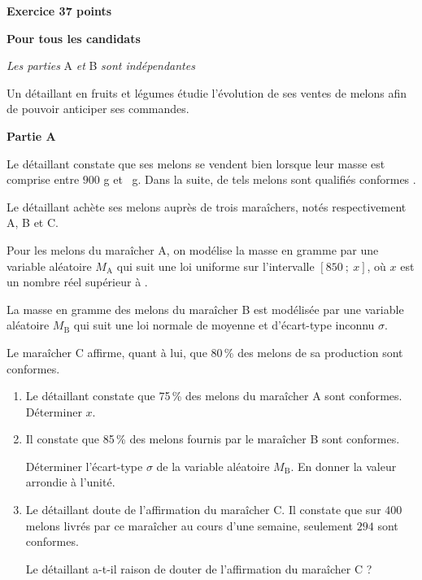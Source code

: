 \documentclass[10pt,a4paper]{article}
\begin{document}
\textbf{Exercice 3\hfill 7 points}
 
\textbf{Pour tous les candidats}

\medskip

\emph{Les parties} A \emph{et} B \emph{sont indépendantes}

\medskip

Un détaillant en fruits et légumes étudie l'évolution de ses ventes de melons afin de pouvoir
anticiper ses commandes.

\bigskip

\textbf{Partie A}

\medskip

Le détaillant constate que ses melons se vendent bien lorsque leur masse est comprise entre $900$ g et
~g. Dans la suite, de tels melons sont qualifiés \og conformes \fg.

Le détaillant achète ses melons auprès de trois maraîchers, notés respectivement A, B et C.

Pour les melons du maraîcher A, on modélise la masse en gramme par une variable aléatoire $M_{\text{A}}$
qui suit une loi uniforme sur l'intervalle $[850~;~x]$, où $x$ est un nombre réel supérieur à .

La masse en gramme des melons du maraîcher B est modélisée par une variable aléatoire $M_{\text{B}}$ qui
suit une loi normale de moyenne  et d'écart-type inconnu $\sigma$.

Le maraîcher C affirme, quant à lui, que 80\,\% des melons de sa production sont conformes.

\medskip

\begin{enumerate}
\item Le détaillant constate que 75\,\% des melons du maraîcher A sont conformes. Déterminer $x$.
\item Il constate que 85\,\% des melons fournis par le maraîcher B sont conformes.

Déterminer l'écart-type $\sigma$ de la variable aléatoire $M_{\text{B}}$. En donner la valeur arrondie à l'unité.
\item Le détaillant doute de l'affirmation du maraîcher C. Il constate que sur $400$ melons livrés par ce
maraîcher au cours d'une semaine, seulement $294$ sont conformes.

Le détaillant a-t-il raison de douter de l'affirmation du maraîcher C ?
\end{enumerate}
\end{document}
